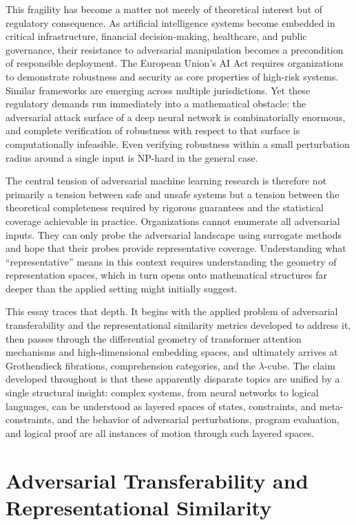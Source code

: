 \documentclass[12pt,a4paper]{article}
\theoremstyle{plain}
\theoremstyle{definition}
\begin{document}
This fragility has become a matter not merely of theoretical interest but of regulatory consequence. As artificial intelligence systems become embedded in critical infrastructure, financial decision-making, healthcare, and public governance, their resistance to adversarial manipulation becomes a precondition of responsible deployment. The European Union's AI Act requires organizations to demonstrate robustness and security as core properties of high-risk systems. Similar frameworks are emerging across multiple jurisdictions. Yet these regulatory demands run immediately into a mathematical obstacle: the adversarial attack surface of a deep neural network is combinatorially enormous, and complete verification of robustness with respect to that surface is computationally infeasible. Even verifying robustness within a small perturbation radius around a single input is NP-hard in the general case.

The central tension of adversarial machine learning research is therefore not primarily a tension between safe and unsafe systems but a tension between the theoretical completeness required by rigorous guarantees and the statistical coverage achievable in practice. Organizations cannot enumerate all adversarial inputs. They can only probe the adversarial landscape using surrogate methods and hope that their probes provide representative coverage. Understanding what ``representative'' means in this context requires understanding the geometry of representation spaces, which in turn opens onto mathematical structures far deeper than the applied setting might initially suggest.

This essay traces that depth. It begins with the applied problem of adversarial transferability and the representational similarity metrics developed to address it, then passes through the differential geometry of transformer attention mechanisms and high-dimensional embedding spaces, and ultimately arrives at Grothendieck fibrations, comprehension categories, and the $\lambda$-cube. The claim developed throughout is that these apparently disparate topics are unified by a single structural insight: complex systems, from neural networks to logical languages, can be understood as layered spaces of states, constraints, and meta-constraints, and the behavior of adversarial perturbations, program evaluation, and logical proof are all instances of motion through such layered spaces.

\section{Adversarial Transferability and Representational Similarity}
\end{document}
